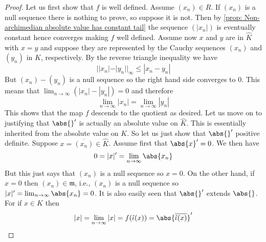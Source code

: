 \documentclass{article}
\newcommand{\mfrak}[1]{\mathfrak{#1}}
\numberwithin{equation}{section}
\begin{document}
\begin{proof}
    Let us first show that $f$ is well defined. Assume $(x_n) \in R$. If $(x_n)$ is a null sequence there is nothing to prove, so suppose it is not. Then by \cref{prop: Non-archimedian absolute value has constant tail} the sequence $(|x_n|)$ is eventually constant hence converges making $f$ well defined. Assume now $x$ and $y$ are in $\hat K$ with $x = y$ and suppose they are represented by the Cauchy sequences $(x_n)$ and $(y_n)$ in $K$, respectively. By the reverse triangle inequality we have
    $$||x_n| - |y_n| |_\infty \leq |x_n - y_n|$$
    But $(x_n) - (y_n)$ is a null sequence so the right hand side converges to 0. This means that $\lim_{n \to \infty} (|x_n| - |y_n|) = 0$ and therefore $$\lim_{n \to \infty} |x_n| = \lim_{n \to \infty}|y_n|$$
    This shows that the map $f$ descends to the quotient as desired.
    Let us move on to justifying that $\abs{}'$ is actually an absolute value on $\hat K$. This is essentially inherited from the absolute value on $K$. So let us just show that $\abs{}'$ positive definite. Suppose $x = \overline {(x_n)} \in \hat K$. Assume first that $\abs{x}' = 0$. We then have
    $$0 = |x|' = \lim_{n \to \infty} \abs{x_n}$$
    But this just says that $(x_n)$ is a null sequence so $x = 0$. On the other hand, if $x = 0$ then $(x_n) \in \mfrak m$, i.e., $(x_n)$ is a null sequence so $|x|' =\lim_{n \to \infty} \abs{x_n} = 0$. It is also easily seen that $\abs{}'$ extends $\abs{}$. For if $x \in K$ then
    $$|x| = \lim_{n \to \infty} |x| = f(\hat \iota (x)) = \abs{\overline{ \hat \iota (x)}}'$$


\end{proof}
\end{document}
